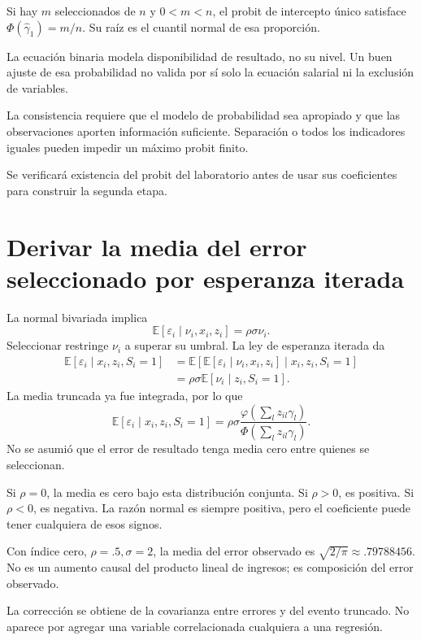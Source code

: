 \documentclass[11pt,a4paper]{article}
\newcommand{\E}{\mathbb E}
\begin{document}
\begin{ejemplo}
Si hay \(m\) seleccionados de \(n\)
y \(0<m<n\), el probit de
intercepto único satisface
\(\Phi(\widehat\gamma_1)=m/n\).
Su raíz es el cuantil normal
de esa proporción.
\end{ejemplo}
La ecuación binaria modela
disponibilidad de resultado,
no su nivel.
Un buen ajuste de esa probabilidad
no valida por sí solo
la ecuación salarial ni
la exclusión de variables.

La consistencia requiere que
el modelo de probabilidad
sea apropiado y que
las observaciones aporten
información suficiente.
Separación o todos los indicadores
iguales pueden impedir
un máximo probit finito.

Se verificará existencia del
probit del laboratorio antes
de usar sus coeficientes
para construir la segunda etapa.

\clearpage
\section{Derivar la media del error seleccionado por esperanza iterada}\label{unidad123}
La normal bivariada implica
\[
\E[\varepsilon_i\mid\nu_i,x_i,z_i]=\rho\sigma\nu_i.
\]
Seleccionar restringe \(\nu_i\)
a superar su umbral.
La ley de esperanza iterada da
\[
\begin{aligned}
\E[\varepsilon_i\mid x_i,z_i,S_i=1]
&=\E[\E[\varepsilon_i\mid\nu_i,x_i,z_i]\mid x_i,z_i,S_i=1]\\
&=\rho\sigma\E[\nu_i\mid z_i,S_i=1].
\end{aligned}
\]
La media truncada ya fue integrada,
por lo que
\[
\boxed{
\E[\varepsilon_i\mid x_i,z_i,S_i=1]
=\rho\sigma
\frac{\varphi(\sum_lz_{il}\gamma_l)}
{\Phi(\sum_lz_{il}\gamma_l)}}.
\]
No se asumió que el error
de resultado tenga media cero
entre quienes se seleccionan.

Si \(\rho=0\), la media es cero
bajo esta distribución conjunta.
Si \(\rho>0\), es positiva.
Si \(\rho<0\), es negativa.
La razón normal es siempre positiva,
pero el coeficiente puede tener
cualquiera de esos signos.

\begin{ejemplo}
Con índice cero, \(\rho=.5,\sigma=2\),
la media del error observado es
\(\sqrt{2/\pi}\approx.79788456\).
No es un aumento causal
del producto lineal de ingresos;
es composición del error observado.
\end{ejemplo}
La corrección se obtiene de
la covarianza entre errores y
del evento truncado.
No aparece por agregar una
variable correlacionada cualquiera
a una regresión.
\end{document}
